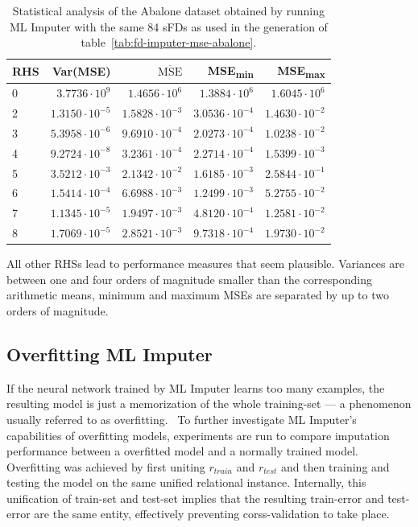 \begin{table}[ht]
    \centering
    \begin{tabular}{lrrrr}
        \toprule
        \toprule
        RHS & Var(MSE) & \( \overline{\text{MSE}} \) & MSE\textsubscript{min} & MSE\textsubscript{max} \\
        \midrule
        0 & \(3.7736 \cdot 10^{9} \) & \(1.4656 \cdot 10^{6} \) & \(1.3884 \cdot 10^{6} \) & \(1.6045 \cdot 10^{6} \) \\
        2 & \( 1.3150 \cdot 10^{-5} \) & \( 1.5828 \cdot 10^{-3} \) & \( 3.0536 \cdot 10^{-4} \) & \( 1.4630 \cdot 10^{-2} \) \\
        3 & \( 5.3958 \cdot 10^{-6} \) & \( 9.6910 \cdot 10^{-4} \) & \( 2.0273 \cdot 10^{-4} \) & \( 1.0238 \cdot 10^{-2} \) \\
        4 & \( 9.2724 \cdot 10^{-8} \) & \( 3.2361 \cdot 10^{-4} \) & \( 2.2714 \cdot 10^{-4} \) & \( 1.5399 \cdot 10^{-3} \) \\
        5 & \( 3.5212 \cdot 10^{-3} \) & \( 2.1342 \cdot 10^{-2} \) & \( 1.6185 \cdot 10^{-3} \) & \( 2.5844 \cdot 10^{-1} \) \\
        6 & \( 1.5414 \cdot 10^{-4} \) & \( 6.6988 \cdot 10^{-3} \) & \( 1.2499 \cdot 10^{-3} \) & \( 5.2755 \cdot 10^{-2} \) \\
        7 & \( 1.1345 \cdot 10^{-5} \)& \( 1.9497 \cdot 10^{-3} \) & \( 4.8120 \cdot 10^{-4} \) & \( 1.2581 \cdot 10^{-2} \) \\
        8 & \( 1.7069 \cdot 10^{-5} \) & \( 2.8521 \cdot 10^{-3} \) & \( 9.7318 \cdot 10^{-4} \) & \( 1.9730 \cdot 10^{-2} \) \\
        \bottomrule
        \bottomrule
    \end{tabular}
    \caption{Statistical analysis of the Abalone dataset obtained by running ML Imputer with the same 84 sFDs as used in the generation of table~\ref{tab:fd-imputer-mse-abalone}.}\label{tab:ml-imputer-mse-abalone}
\end{table}

All other RHSs lead to performance measures that seem plausible.
Variances are between one and four orders of magnitude smaller than the corresponding arithmetic means, minimum and maximum MSEs are separated by up to two orders of magnitude.

\subsection{Overfitting ML Imputer}
If the neural network trained by ML Imputer learns too many examples, the resulting model is just a memorization of the whole training-set --- a phenomenon usually referred to as overfitting.~\cite[p.~164]{HAY08}
To further investigate ML Imputer's capabilities of overfitting models, experiments are run to compare imputation performance between a overfitted model and a normally trained model.
Overfitting was achieved by first uniting \( r_{train} \) and \( r_{test} \) and then training and testing the model on the same unified relational instance.
Internally, this unification of train-set and test-set implies that the resulting train-error and test-error are the same entity, effectively preventing corss-validation to take place.

